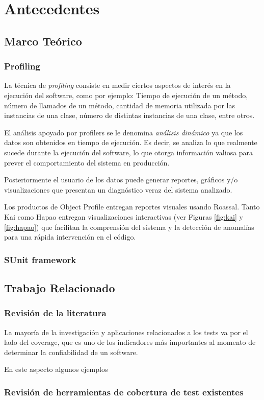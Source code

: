 \chapter{Antecedentes}


\section{Marco Teórico}

\subsection{Profiling}
\par La técnica de \emph{profiling} consiste en medir ciertos aspectos de interés en la ejecución del software, como por ejemplo: Tiempo de ejecución de un método, número de llamados de un método, cantidad de memoria utilizada por las instancias de una clase, número de distintas instancias de una clase, entre otros. 
\par El análisis apoyado por profilers se le denomina \emph{análisis dinámico} ya que los datos son obtenidos en tiempo de ejecución. Es decir, se analiza lo que realmente sucede durante la ejecución del software, lo que otorga información valiosa para prever el comportamiento del sistema en producción.
\par Posteriormente el usuario de los datos puede generar reportes, gráficos y/o visualizaciones que presentan un diagnóstico veraz del sistema analizado. 
\par Los productos de Object Profile  entregan reportes visuales usando Roassal. Tanto Kai como Hapao entregan visualizaciones interactivas (ver Figuras \ref{fig:kai} y \ref{fig:hapao}) que facilitan la comprensión del sistema y la detección de anomalías para una rápida intervención en el código.

\subsection{SUnit framework}


\section{Trabajo Relacionado}
\subsection{Revisión de la literatura}
\par La mayoría de la investigación y aplicaciones relacionados a los tests va por el lado del coverage, que es uno de los indicadores más importantes al momento de determinar la confiabilidad de un software. 
\par En este aspecto algunos ejemplos 

\subsection{Revisión de herramientas de cobertura de test existentes}
